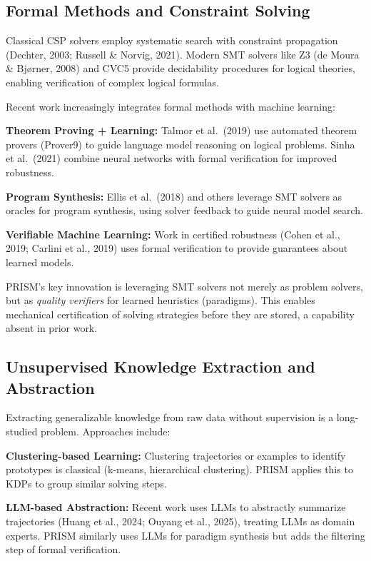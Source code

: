 \subsection{Formal Methods and Constraint Solving}

Classical CSP solvers employ systematic search with constraint propagation (Dechter, 2003; Russell \& Norvig, 2021). Modern SMT solvers like Z3 (de Moura \& Bjørner, 2008) and CVC5 provide decidability procedures for logical theories, enabling verification of complex logical formulas.

Recent work increasingly integrates formal methods with machine learning:

\textbf{Theorem Proving + Learning:} Talmor et al.~(2019) use automated theorem provers (Prover9) to guide language model reasoning on logical problems. Sinha et al.~(2021) combine neural networks with formal verification for improved robustness.

\textbf{Program Synthesis:} Ellis et al.~(2018) and others leverage SMT solvers as oracles for program synthesis, using solver feedback to guide neural model search.

\textbf{Verifiable Machine Learning:} Work in certified robustness (Cohen et al., 2019; Carlini et al., 2019) uses formal verification to provide guarantees about learned models.

PRISM's key innovation is leveraging SMT solvers not merely as problem solvers, but as \textit{quality verifiers} for learned heuristics (paradigms). This enables mechanical certification of solving strategies before they are stored, a capability absent in prior work.

\subsection{Unsupervised Knowledge Extraction and Abstraction}

Extracting generalizable knowledge from raw data without supervision is a long-studied problem. Approaches include:

\textbf{Clustering-based Learning:} Clustering trajectories or examples to identify prototypes is classical (k-means, hierarchical clustering). PRISM applies this to KDPs to group similar solving steps.

\textbf{LLM-based Abstraction:} Recent work uses LLMs to abstractly summarize trajectories (Huang et al., 2024; Ouyang et al., 2025), treating LLMs as domain experts. PRISM similarly uses LLMs for paradigm synthesis but adds the filtering step of formal verification.

